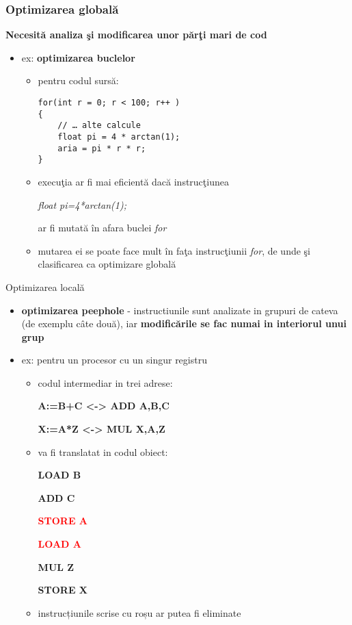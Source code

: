 \documentclass[pdf]{beamer}
\begin{document}
\begin{frame}[fragile]
\frametitle{Optimizarea globală}

\textbf{Necesită analiza şi modificarea unor părţi mari de cod}

\begin{itemize}
\item
ex: \textbf{optimizarea buclelor}
\begin{itemize}
\item 
pentru codul sursă:
\begin{verbatim}
for(int r = 0; r < 100; r++ )
{
    // … alte calcule
    float pi = 4 * arctan(1);
    aria = pi * r * r;
}
\end{verbatim}

\item 
execuţia ar fi mai eficientă dacă instrucţiunea 

\textit{float pi=4*arctan(1);}

ar fi mutată în afara buclei \textit{for}

\item
mutarea ei se poate face mult în faţa instrucţiunii \textit{for}, de unde şi clasificarea ca optimizare globală
\end{itemize}
\end{itemize}
\end{frame}



\begin{frame}{Optimizarea locală}
\begin{itemize}
\item 
\textbf{optimizarea peephole} - instructiunile sunt analizate in grupuri de cateva (de exemplu câte două), iar \textbf{modificările se fac numai in interiorul unui grup}

\item
ex: pentru un procesor cu un singur registru 
\begin{itemize}
\item
codul intermediar in trei adrese:

\textbf{A:=B+C <-> ADD A,B,C}

\textbf{X:=A*Z <-> MUL X,A,Z}

\item
va fi translatat in codul obiect:

\textbf{LOAD B}

\textbf{ADD C}

\textcolor{red}{\textbf{STORE A}}

\textcolor{red}{\textbf{LOAD A}}

\textbf{MUL Z}

\textbf{STORE X}

\item
instrucțiunile scrise cu roșu ar putea fi eliminate
\end{itemize}
\end{itemize}
\end{frame}
\end{document}
